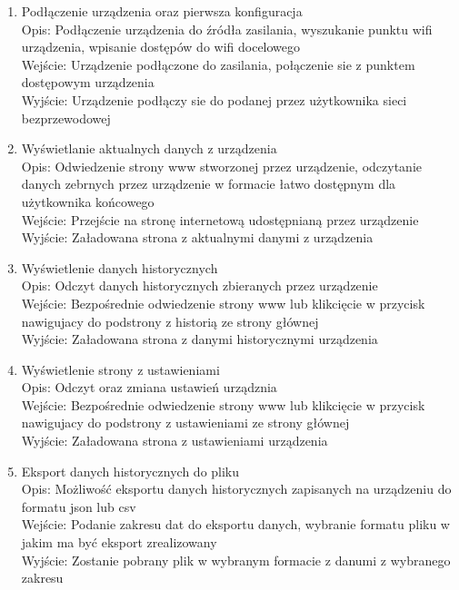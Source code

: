 \documentclass[12pt,a4paper]{article}
\begin{document}
\begin{enumerate}
    \item Podłączenie urządzenia oraz pierwsza konfiguracja\\
    Opis: Podłączenie urządzenia do źródła zasilania, wyszukanie punktu wifi urządzenia, wpisanie dostępów do wifi docelowego\\
    Wejście: Urządzenie podłączone do zasilania, połączenie sie z punktem dostępowym urządzenia\\
    Wyjście: Urządzenie podłączy sie do podanej przez użytkownika sieci bezprzewodowej
    \item Wyświetlanie aktualnych danych z urządzenia\\
    Opis: Odwiedzenie strony www stworzonej przez urządzenie, odczytanie danych zebrnych przez urządzenie w formacie łatwo dostępnym dla
    użytkownika końcowego\\
    Wejście: Przejście na stronę internetową udostępnianą przez urządzenie\\
    Wyjście: Załadowana strona z aktualnymi danymi z urządzenia\\
    \item Wyświetlenie danych historycznych\\
    Opis: Odczyt danych historycznych zbieranych przez urządzenie\\
    Wejście: Bezpośrednie odwiedzenie strony www lub klikcięcie w przycisk nawigujacy do podstrony z historią ze strony głównej\\
    Wyjście: Załadowana strona z danymi historycznymi urządzenia\\
    \item Wyświetlenie strony z ustawieniami\\
    Opis: Odczyt oraz zmiana ustawień urządznia\\
    Wejście: Bezpośrednie odwiedzenie strony www lub klikcięcie w przycisk nawigujacy do podstrony z ustawieniami ze strony głównej\\
    Wyjście: Załadowana strona z ustawieniami urządzenia\\
    \item Eksport danych historycznych do pliku\\
    Opis: Możliwość eksportu danych historycznych zapisanych na urządzeniu do formatu json lub csv\\
    Wejście: Podanie zakresu dat do eksportu danych, wybranie formatu pliku w jakim ma być eksport zrealizowany\\
    Wyjście: Zostanie pobrany plik w wybranym formacie z danumi z wybranego zakresu\\
\end{enumerate}
\end{document}
